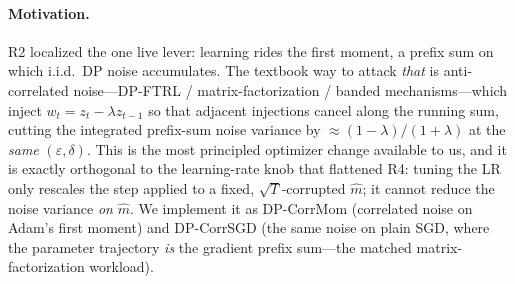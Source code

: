\documentclass[11pt]{article}
\theoremstyle{plain}
\theoremstyle{definition}
\theoremstyle{remark}
\begin{document}
\paragraph{Motivation.}
R2 localized the one live lever: learning rides the first moment, a prefix sum on which i.i.d.\ DP
noise accumulates. The textbook way to attack \emph{that} is anti-correlated noise---DP-FTRL /
matrix-factorization / banded mechanisms---which inject $w_t = z_t - \lambda z_{t-1}$ so that
adjacent injections cancel along the running sum, cutting the integrated prefix-sum noise variance by
$\approx(1-\lambda)/(1+\lambda)$ at the \emph{same} $(\varepsilon,\delta)$. This is the most principled
optimizer change available to us, and it is exactly orthogonal to the learning-rate knob that flattened
R4: tuning the LR only rescales the step applied to a fixed, $\sqrt{T}$-corrupted $\hat m$; it cannot
reduce the noise variance \emph{on} $\hat m$. We implement it as DP-CorrMom (correlated noise on Adam's
first moment) and DP-CorrSGD (the same noise on plain SGD, where the parameter trajectory \emph{is} the
gradient prefix sum---the matched matrix-factorization workload).
\end{document}
